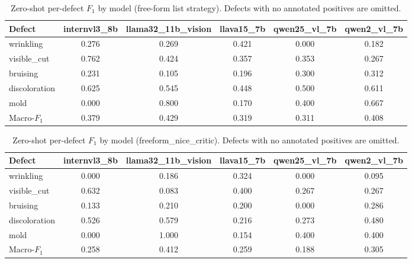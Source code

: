 \begin{table}[!htbp]
\centering
\caption{Zero-shot per-defect $F_1$ by model (free-form list strategy). Defects with no annotated positives are omitted.}
\label{tab:defects_f1_freeform_list}
\begin{tabular}{@{}lccccc@{}}
\toprule
\textbf{Defect} & \textbf{internvl3\_8b} & \textbf{llama32\_11b\_vision} & \textbf{llava15\_7b} & \textbf{qwen25\_vl\_7b} & \textbf{qwen2\_vl\_7b} \\
\midrule
wrinkling & 0.276 & 0.269 & 0.421 & 0.000 & 0.182 \\
visible\_cut & 0.762 & 0.424 & 0.357 & 0.353 & 0.267 \\
bruising & 0.231 & 0.105 & 0.196 & 0.300 & 0.312 \\
discoloration & 0.625 & 0.545 & 0.448 & 0.500 & 0.611 \\
mold & 0.000 & 0.800 & 0.170 & 0.400 & 0.667 \\
\midrule
Macro-$F_1$ & 0.379 & 0.429 & 0.319 & 0.311 & 0.408 \\
\bottomrule
\end{tabular}
\end{table}

\begin{table}[!htbp]
\centering
\caption{Zero-shot per-defect $F_1$ by model (freeform\_nice\_critic). Defects with no annotated positives are omitted.}
\label{tab:defects_f1_freeform_nice_critic}
\begin{tabular}{@{}lccccc@{}}
\toprule
\textbf{Defect} & \textbf{internvl3\_8b} & \textbf{llama32\_11b\_vision} & \textbf{llava15\_7b} & \textbf{qwen25\_vl\_7b} & \textbf{qwen2\_vl\_7b} \\
\midrule
wrinkling & 0.000 & 0.186 & 0.324 & 0.000 & 0.095 \\
visible\_cut & 0.632 & 0.083 & 0.400 & 0.267 & 0.267 \\
bruising & 0.133 & 0.210 & 0.200 & 0.000 & 0.286 \\
discoloration & 0.526 & 0.579 & 0.216 & 0.273 & 0.480 \\
mold & 0.000 & 1.000 & 0.154 & 0.400 & 0.400 \\
\midrule
Macro-$F_1$ & 0.258 & 0.412 & 0.259 & 0.188 & 0.305 \\
\bottomrule
\end{tabular}
\end{table}


